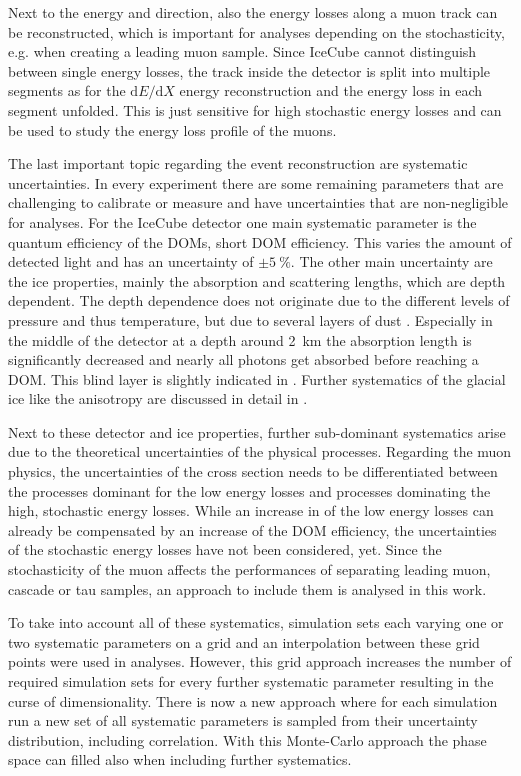 Next to the energy and direction, also the energy losses along a muon track can be reconstructed, which is important for analyses depending on the stochasticity, e.g. when creating a leading muon sample.
Since IceCube cannot distinguish between single energy losses, the track inside the detector is split into multiple segments as for the $\mathrm{d}E/\mathrm{d}X$ energy reconstruction and the energy loss in each segment unfolded.
This is just sensitive for high stochastic energy losses and can be used to study the energy loss profile of the muons.

The last important topic regarding the event reconstruction are systematic uncertainties.
In every experiment there are some remaining parameters that are challenging to calibrate or measure and have uncertainties that are non-negligible for analyses.
For the IceCube detector one main systematic parameter is the quantum efficiency of the DOMs, short DOM efficiency.
This varies the amount of detected light and has an uncertainty of $\pm\SI{5}{\percent}$.
The other main uncertainty are the ice properties, mainly the absorption and scattering lengths, which are depth dependent.
The depth dependence does not originate due to the different levels of pressure and thus temperature, but due to several layers of dust \cite{Icecube06ice, Icecube13ice}.
Especially in the middle of the detector at a depth around \SI{2}{km} the absorption length is significantly decreased and nearly all photons get absorbed before reaching a DOM.
This blind layer is slightly indicated in .
Further systematics of the glacial ice like the anisotropy are discussed in detail in \cite{Rongen19PhD}.

Next to these detector and ice properties, further sub-dominant systematics arise due to the theoretical uncertainties of the physical processes.
Regarding the muon physics, the uncertainties of the cross section needs to be differentiated between the processes dominant for the low energy losses and processes dominating the high, stochastic energy losses.
While an increase in of the low energy losses can already be compensated by an increase of the DOM efficiency, the uncertainties of the stochastic energy losses have not been considered, yet.
Since the stochasticity of the muon affects the performances of separating leading muon, cascade or tau samples, an approach to include them is analysed in this work.

To take into account all of these systematics, simulation sets each varying one or two systematic parameters on a grid and an interpolation between these grid points were used in analyses.
However, this grid approach increases the number of required simulation sets for every further systematic parameter resulting in the curse of dimensionality.
There is now a new approach \cite{IceCube2019SnowStorm} where for each simulation run a new set of all systematic parameters is sampled from their uncertainty distribution, including correlation.
With this Monte-Carlo approach the phase space can filled also when including further systematics.
